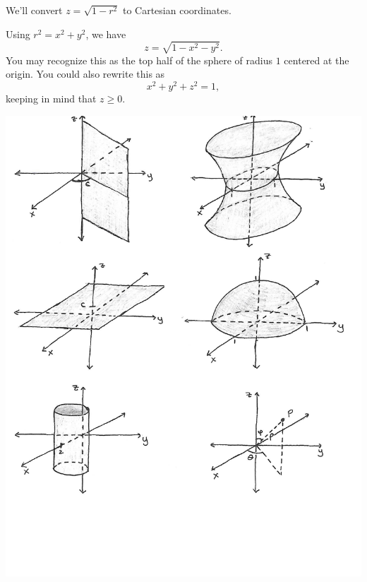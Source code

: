 \documentclass{ximera}
\begin{document}
\begin{example}
We'll convert $z = \sqrt{1-r^2}$ to Cartesian coordinates.

Using $r^2 = x^2 + y^2$, we have
\[
z = \sqrt{1-x^2-y^2}.
\]
You may recognize this as the top half of the sphere of radius $1$ centered at the origin. You could also rewrite this as
\[
x^2+y^2+z^2=1,
\]
keeping in mind that $z\geq 0$.

\begin{image}
\includegraphics{half_sphere}
\end{image}
\end{example}
\end{document}
